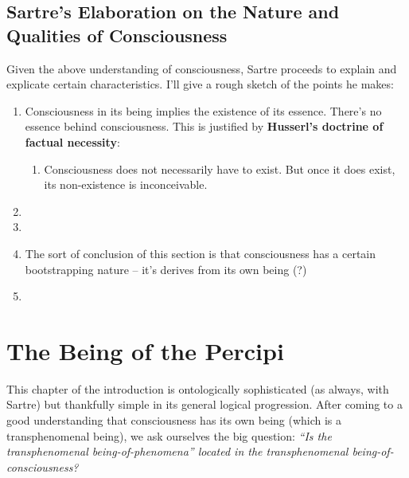 \subsection{Sartre's Elaboration on the Nature and Qualities of Consciousness}
Given the above understanding of consciousness, Sartre proceeds to explain and explicate certain characteristics. I'll give a rough sketch of the points he makes:

\begin{enumerate}
  \item Consciousness in its being implies the existence of its essence. There's no essence behind consciousness. This is justified by \textbf{Husserl's doctrine of factual necessity}:
  \begin{enumerate}
    \item Consciousness does not necessarily have to exist. But once it does exist, its non-existence is inconceivable.
  \end{enumerate}
  \item {}
  \item {}
  \item The sort of conclusion of this section is that consciousness has a certain bootstrapping nature -- it's derives from its own being (?)
  \item {}
\end{enumerate}

\section{The Being of the Percipi}

This chapter of the introduction is ontologically sophisticated (as always, with Sartre) but thankfully simple in its general logical progression. After coming to a good understanding that consciousness has its own being (which is a transphenomenal being), we ask ourselves the big question: \emph{\enquote{Is the transphenomenal being-of-phenomena} located in the transphenomenal being-of-consciousness?}

